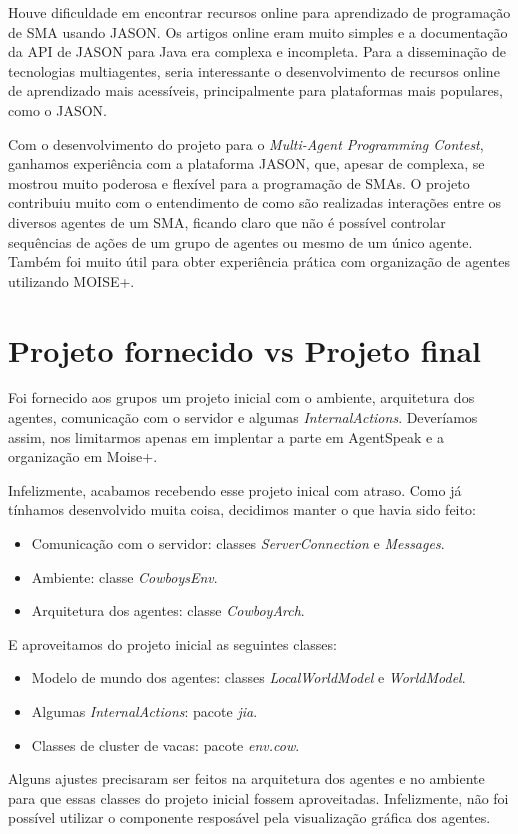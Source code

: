 \documentclass{llncs}
\begin{document}
Houve dificuldade em encontrar recursos online para aprendizado de programação de SMA usando JASON. Os artigos online eram muito simples e a documentação da API de JASON para Java era complexa e incompleta. Para a disseminação de tecnologias multiagentes, seria interessante o desenvolvimento de recursos online de aprendizado mais acessíveis, principalmente para plataformas mais populares, como o JASON.

Com o desenvolvimento do projeto para o \textit{Multi-Agent Programming Contest}, ganhamos experiência com a plataforma JASON, que, apesar de complexa, se mostrou muito poderosa e flexível para a programação de SMAs. O projeto contribuiu muito com o entendimento de como são realizadas interações entre os diversos agentes de um SMA, ficando claro que não é possível controlar sequências de ações de um grupo de agentes ou mesmo de um único agente. Também foi muito útil para obter experiência prática com organização de agentes utilizando MOISE+.




\renewcommand*{\appendixname}{Anexo}
\appendix


\section{Projeto fornecido vs Projeto final}
Foi fornecido aos grupos um projeto inicial com o ambiente, arquitetura dos agentes, comunicação com o servidor e algumas \textit{InternalActions}. Deveríamos assim, nos limitarmos apenas em implentar a parte em AgentSpeak e a organização em Moise+.

Infelizmente, acabamos recebendo esse projeto inical com atraso. Como já tínhamos desenvolvido muita coisa, decidimos manter o que havia sido feito:

\begin{itemize}
\item Comunicação com o servidor: classes \textit{ServerConnection} e \textit{Messages}.
\item Ambiente: classe \textit{CowboysEnv}.
\item Arquitetura dos agentes: classe \textit{CowboyArch}.
\end{itemize}

E aproveitamos do projeto inicial as seguintes classes:
\begin{itemize}
\item Modelo de mundo dos agentes: classes \textit{LocalWorldModel} e \textit{WorldModel}.
\item Algumas \textit{InternalActions}: pacote \textit{jia}.
\item Classes de cluster de vacas: pacote \textit{env.cow}.
\end{itemize}

Alguns ajustes precisaram ser feitos na arquitetura dos agentes e no ambiente para que essas classes do projeto inicial fossem aproveitadas. Infelizmente, não foi possível utilizar o componente resposável pela visualização gráfica dos agentes.
\end{document}
